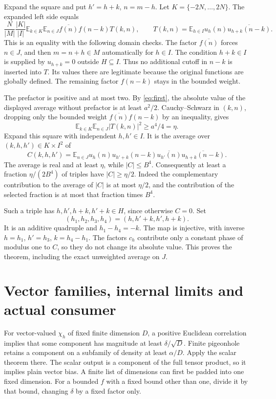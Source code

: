 \documentclass[11pt]{article}
\newcommand{\E}{\mathbb E}
\begin{document}
Expand the square and put $h'=h+k$, $n=m-h$.
Let $K=\{-2N,\ldots,2N\}$. The expanded left side equals
\[
 \frac{N}{|M|}\frac{|K|}{|I|}
 \E_{k\in K}\E_{n\in J}
 \overline{f(n)}f(n-k)T(k,n),
 \qquad
 T(k,n)=\E_{h\in I}u_h(n)\overline{u_{h+k}(n-k)}.
\]
This is an equality with the following domain checks. The factor
$\overline{f(n)}$ forces $n\in J$, and then $m=n+h\in M$
automatically for $h\in I$. The condition $h+k\in I$ is supplied
by $u_{h+k}=0$ outside $H\subseteq I$. Thus no additional cutoff
in $n-k$ is inserted into $T$. Its values there are legitimate because
the original functions are globally defined. The remaining factor
$f(n-k)$ stays in the bounded weight.

The prefactor is positive and at most two. By \eqref{eq:first},
the absolute value of the displayed average without prefactor is
at least $a^2/2$. Cauchy--Schwarz in $(k,n)$, dropping only the
bounded weight $\overline{f(n)}f(n-k)$ by an inequality, gives
\[
 \E_{k\in K}\E_{n\in J}|T(k,n)|^2\geq a^4/4=\eta.
\]
Expand this square with independent $h,h'\in I$. It is the average
over $(k,h,h')\in K\times I^2$ of
\[
 C(k,h,h')=\E_{n\in J}
 u_h(n)u_{h'+k}(n-k)
       \overline{u_{h'}(n)}\overline{u_{h+k}(n-k)}.
\]
The average is real and at least $\eta$, while $|C|\leq B^4$.
Consequently at least a fraction $\eta/(2B^4)$ of triples have
$|C|\geq\eta/2$. Indeed the complementary contribution to the
average of $|C|$ is at most $\eta/2$, and the contribution of the
selected fraction is at most that fraction times $B^4$.

Such a triple has $h,h',h+k,h'+k\in H$, since otherwise $C=0$.
Set
\[
 (h_1,h_2,h_3,h_4)=(h,h'+k,h',h+k).
\]
It is an additive quadruple and $h_1-h_4=-k$. The map is injective,
with inverse $h=h_1$, $h'=h_3$, $k=h_4-h_1$.
The factors $c_h$ contribute only a constant phase of modulus one
to $C$, so they do not change its absolute value. This proves the
theorem, including the exact unweighted average on $J$.

\section{Vector families, internal limits and actual consumer}
For vector-valued $\chi_h$ of fixed finite dimension $D$, a positive
Euclidean correlation implies that some component has magnitude at
least $\delta/\sqrt D$. Finite pigeonhole retains a component on
a subfamily of density at least $\alpha/D$. Apply the scalar theorem
there. The scalar output is a component of the full tensor product,
so it implies plain vector bias. A finite list of dimensions can first
be padded into one fixed dimension. For a bounded $f$ with a fixed
bound other than one, divide it by that bound, changing $\delta$
by a fixed factor only.
\end{document}
